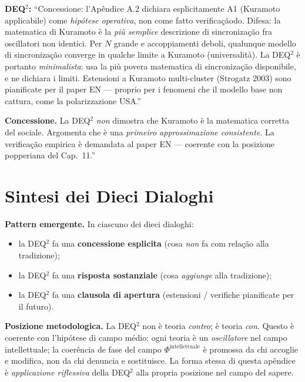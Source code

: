 \textbf{DEQ$^2$:} ``Concessione: l'Apêndice A.2 dichiara esplicitamente A1
(Kuramoto applicabile) come \emph{hipótese operativa}, non come fatto
verificaçãodo. Difesa: la matematica di Kuramoto è la \emph{più semplice}
descrizione di sincronização fra oscillatori non identici. Per \(N\)
grande e accoppiamenti deboli, qualunque modello di sincronização
converge in qualche limite a Kuramoto (universalità). La DEQ$^2$ è portanto
\emph{minimalista}: usa la più povera matematica di sincronização
disponibile, e ne dichiara i limiti. Estensioni a Kuramoto multi-cluster
(Strogatz 2003) sono pianificate per il paper EN --- proprio per i
fenomeni che il modello base non cattura, come la polarizzazione USA.''

\textbf{Concessione.} La DEQ$^2$ \emph{non} dimostra che Kuramoto è la
matematica corretta del sociale. Argomenta che è una \emph{primeiro
approssimazione consistente}. La verificação empirica è demandata al paper
EN --- coerente con la posizione popperiana del Cap.~11.''



\section{Sintesi dei Dieci Dialoghi}\label{sintesi-dei-dieci-dialoghi}

\Proved{} \textbf{Pattern emergente.} In ciascuno dei dieci dialoghi:

\begin{itemize}
\tightlist
\item
  la DEQ$^2$ fa una \textbf{concessione esplicita} (cosa \emph{non} fa
  com relação alla tradizione);
\item
  la DEQ$^2$ fa una \textbf{risposta sostanziale} (cosa \emph{aggiunge}
  alla tradizione);
\item
  la DEQ$^2$ fa una \textbf{clausola di apertura} (estensioni / verifiche
  pianificate per il futuro).
\end{itemize}

\Hypoth{} \textbf{Posizione metodologica.} La DEQ$^2$ non è teoria
\emph{contro}; è teoria \emph{con}. Questo è coerente con l'hipótese di
campo médio: ogni teoria è un \emph{oscillatore} nel campo
intellettuale; la coerência de fase del campo
\(\Phi^{\text{intellettuale}}\) è promossa da chi accoglie e modifica,
non da chi denuncia e sostituisce. La forma stessa di questa apêndice è
\emph{applicazione riflessiva} della DEQ$^2$ alla propria posizione nel
campo del sapere.

